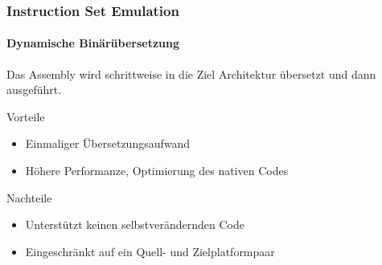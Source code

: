 \begin{frame}
    \frametitle{Instruction Set Emulation}
    \framesubtitle{Dynamische Binärübersetzung}

    Das Assembly wird schrittweise in die Ziel Architektur übersetzt und dann ausgeführt.

    \vspace{0.50cm}

    \begin{exampleblock}{Vorteile}
        \begin{itemize}
            \item[$\textcolor{TUMGreen}\blacksquare$] Einmaliger Übersetzungsaufwand
            \item[$\textcolor{TUMGreen}\blacksquare$] Höhere Performanze, Optimierung des nativen Codes
        \end{itemize}
    \end{exampleblock}

    \vspace{0.50cm}

    \begin{alertblock}{Nachteile}
        \begin{itemize}
            \item[$\textcolor{TUMOrange}\blacksquare$] Unterstützt keinen selbstverändernden Code
            \item[$\textcolor{TUMOrange}\blacksquare$] Eingeschränkt auf ein Quell- und Zielplatformpaar
        \end{itemize}
    \end{alertblock}
\end{frame}

